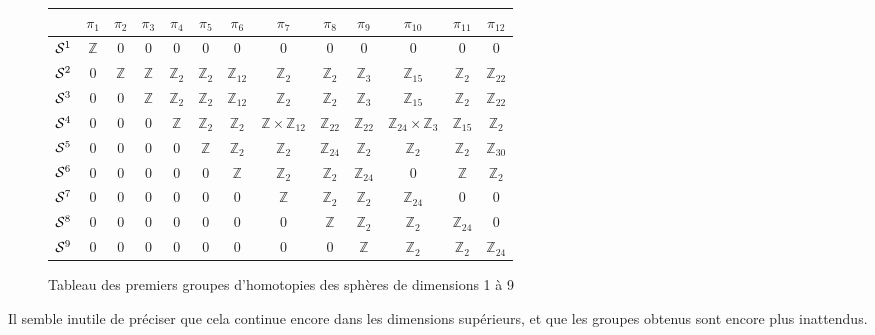 \begin{figure}[H]
    \centering
    \small
    \begin{tabular}{|c|c|c|c|c|c|c|c|c|c|c|c|c|}
\hline
 & $\pi_1$ & $\pi_2$ & $\pi_3$ & $\pi_4$ & $\pi_5$ & $\pi_6$ & $\pi_7$ & $\pi_8$ & $\pi_9$ & $\pi_{10}$ & $\pi_{11}$ & $\pi_{12}$ \\
\hline
$\mathcal{S}^{1}$ & $\mathbb{Z}$ & $0$ & $0$ & $0$ & $0$ & $0$ & $0$ & $0$ & $0$ & $0$ & $0$ & $0$\\
\hline
$\mathcal{S}^{2}$ & $0$ & $\mathbb{Z}$ & $\mathbb{Z}$ & $\mathbb{Z}_2$ & $\mathbb{Z}_2$ & $\mathbb{Z}_{12}$ & $\mathbb{Z}_2$ & $\mathbb{Z}_2$ & $\mathbb{Z}_3$ & $\mathbb{Z}_{15}$ & $\mathbb{Z}_2$ & $\mathbb{Z}_{22}$ \\
\hline
$\mathcal{S}^{3}$ & $0$ & $0$ & $\mathbb{Z}$ & $\mathbb{Z}_2$ & $\mathbb{Z}_2$ & $\mathbb{Z}_{12}$ & $\mathbb{Z}_2$ & $\mathbb{Z}_2$ & $\mathbb{Z}_3$ & $\mathbb{Z}_{15}$ & $\mathbb{Z}_2$ & $\mathbb{Z}_{22}$ \\
\hline
$\mathcal{S}^{4}$ & $0$ & $0$ & $0$ & $\mathbb{Z}$ & $\mathbb{Z}_2$ & $\mathbb{Z}_2$ & $\mathbb{Z} \times \mathbb{Z}_{12}$ & $\mathbb{Z}_{22}$ & $\mathbb{Z}_{22}$ & $\mathbb{Z}_{24} \times \mathbb{Z}_3$ & $\mathbb{Z}_{15}$ & $\mathbb{Z}_2$ \\
\hline
$\mathcal{S}^{5}$ & $0$ & $0$ & $0$ & $0$ & $\mathbb{Z}$ & $\mathbb{Z}_2$ & $\mathbb{Z}_2$ & $\mathbb{Z}_{24}$ & $\mathbb{Z}_2$ & $\mathbb{Z}_2$ & $\mathbb{Z}_2$ & $\mathbb{Z}_{30}$ \\
\hline
$\mathcal{S}^{6}$ & $0$ & $0$ & $0$ & $0$ & $0$ & $\mathbb{Z}$ & $\mathbb{Z}_2$ & $\mathbb{Z}_2$ & $\mathbb{Z}_{24}$ & $0$ & $\mathbb{Z}$ & $\mathbb{Z}_2$ \\
\hline
$\mathcal{S}^{7}$ & $0$ & $0$ & $0$ & $0$ & $0$ & $0$ & $\mathbb{Z}$ & $\mathbb{Z}_2$ & $\mathbb{Z}_2$ & $\mathbb{Z}_{24}$ & $0$ & $0$ \\
\hline
$\mathcal{S}^{8}$ & $0$ & $0$ & $0$ & $0$ & $0$ & $0$ & $0$ & $\mathbb{Z}$ & $\mathbb{Z}_2$ & $\mathbb{Z}_2$ & $\mathbb{Z}_{24}$ & $0$ \\
\hline
$\mathcal{S}^{9}$ & $0$ & $0$ & $0$ & $0$ & $0$ & $0$ & $0$ & $0$ & $\mathbb{Z}$ & $\mathbb{Z}_2$ & $\mathbb{Z}_2$ & $\mathbb{Z}_{24}$ \\
\hline
\end{tabular}
    \caption{Tableau des premiers groupes d'homotopies des sphères de dimensions 1 à 9}
    \label{fig:homotopy-groups-spheres}
\end{figure}

Il semble inutile de préciser que cela continue encore dans les dimensions supérieurs, et que les groupes obtenus sont encore plus inattendus.
